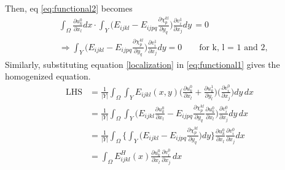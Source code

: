 \documentclass[openright,twoside]{iitkthesis}
\begin{document}
Then, eq \eqref{eq:functional2} becomes
\begin{align}
&\int_\Omega\frac{\partial u_{k}^0}{\partial x_l}dx\cdot\int_Y \bigg (E_{ijkl}-E_{ijpq}\frac{\partial \chi^{kl}_p}{\partial y_q}\bigg )\frac{\partial v_{i}^1}{\partial x_j} dy\,=0\\
\label{eq:homogenized1}
&\Rightarrow \int_Y \bigg (E_{ijkl}-E_{ijpq}\frac{\partial \chi^{kl}_p}{\partial y_q}\bigg )\frac{\partial v_{i}^1}{\partial x_j} dy=0  \qquad \text{for k, l = 1 and 2,}
\end{align}
Similarly, substituting equation \eqref{localization} in \eqref{eq:functional1} gives the homogenized equation.
\begin{align*}
\text{LHS}&=\frac{1}{|Y|}\int_\Omega\int_Y E_{ijkl}(x,y)\bigg (\frac{\partial u_{k}^0}{\partial x_l}+\frac{\partial u_{k}^1}{\partial y_l}\bigg )\bigg (\frac{\partial v_{i}^0}{\partial x_j}\bigg ) dy\,dx\\
&=\frac{1}{|Y|}\int_\Omega\int_Y \bigg (E_{ijkl}\frac{\partial u_{k}^0}{\partial x_l}-E_{ijpq}\frac{\partial \chi^{kl}_p}{\partial y_q}\frac{\partial u_{k}^0}{\partial x_l}\bigg )\frac{\partial v_{i}^0}{\partial x_j} dy\,dx\\
&=\frac{1}{|Y|}\int_\Omega\Bigg \{\int_Y \bigg (E_{ijkl}-E_{ijpq}\frac{\partial \chi^{kl}_p}{\partial y_q}\bigg )dy\Bigg \}\frac{\partial u_{k}^0}{\partial x_l}\frac{\partial v_{i}^0}{\partial x_j}dx\\
&=\int_\Omega E^H_{ijkl}(x)\frac{\partial u_{k}^0}{\partial x_l}\frac{\partial v_{i}^0}{\partial x_j}\,dx
\end{align*}
\end{document}
